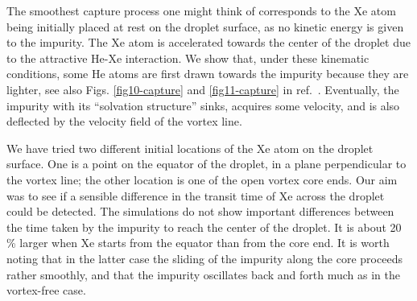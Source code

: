 

The smoothest capture process one might think of corresponds to  the Xe atom being initially placed at rest on the droplet surface, as no kinetic energy is 
given to the impurity. The Xe atom is accelerated  towards the center of the droplet due to the attractive He-Xe interaction. 
We show  that, under these kinematic conditions, some He atoms are first drawn towards the  impurity because they are lighter, see also Figs. \ref{fig10-capture} and \ref{fig11-capture} in ref.~\citep{ESI}. 
Eventually, the impurity with its ``solvation structure'' sinks, acquires some velocity, and is also deflected by the velocity field of the 
vortex line. 

 We have tried two different initial locations of the Xe atom on the droplet surface.  One is  a point on the equator of the droplet, in a plane perpendicular to the vortex line; 
 the other location is one of the open vortex core ends.  Our aim was to see if a sensible difference in the transit time of Xe across the droplet
could be detected.  The simulations do not show important differences between the time taken by the impurity to reach the center of the droplet. It is about 20 \% larger
when Xe starts from the equator than from the core end.\citep{ESI} It is worth noting that  in the latter case the sliding of the impurity along the core proceeds rather smoothly, and that the impurity
oscillates back and forth much as in the vortex-free case. 

